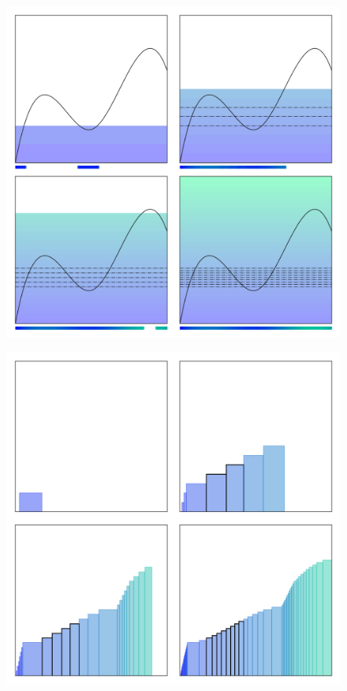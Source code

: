 \clearpage\maketitle
\thispagestyle{empty}
\begin{figure}[H]
	\centering
	\includegraphics[width=\columnwidth]{Code/Title1.png}
\end{figure}

\newpage

\vskip 2cm
\begin{figure}[H]
    \centering
    \includegraphics[width=\linewidth]{Code/Title2.png}
\end{figure}

\newpage

\tableofcontents

\newpage